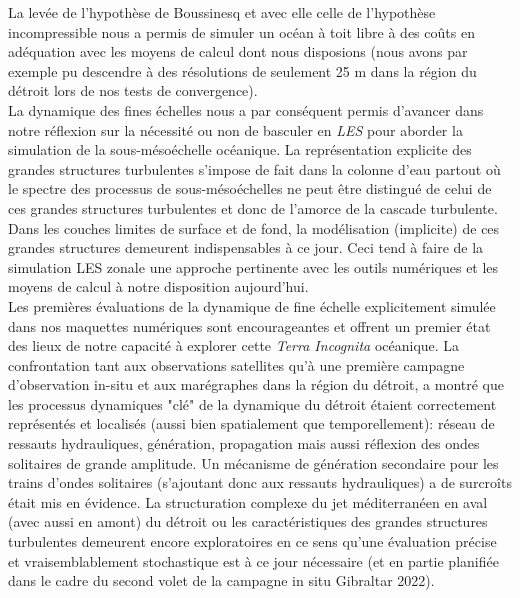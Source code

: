 La levée de l'hypothèse de Boussinesq et avec elle celle de l'hypothèse incompressible nous a permis de simuler un océan à toit libre à des coûts en adéquation avec les moyens de calcul dont nous disposions (nous avons par exemple pu descendre à des résolutions de seulement 25 m dans la région du détroit lors de nos tests de convergence).\\
La dynamique des fines échelles nous a par conséquent permis d'avancer dans notre réflexion sur la nécessité ou non de basculer en \textit{LES} pour aborder la simulation de la sous-mésoéchelle océanique. La représentation explicite des grandes structures turbulentes s'impose de fait dans la colonne d'eau partout où le spectre des processus de sous-mésoéchelles ne peut être distingué de celui de ces grandes structures turbulentes et donc de l'amorce de la cascade turbulente. Dans les couches limites de surface et de fond, la modélisation (implicite) de ces grandes structures demeurent indispensables à ce jour. Ceci tend à faire de la simulation LES zonale une approche pertinente avec les outils numériques et les moyens de calcul à notre disposition aujourd'hui.\\
Les premières évaluations de la dynamique de fine échelle explicitement simulée dans nos maquettes numériques sont encourageantes et offrent un premier état des lieux de notre capacité à explorer cette \textit{Terra Incognita} océanique. La confrontation tant aux observations satellites qu'à une première campagne d'observation in-situ et aux marégraphes dans la région du détroit, a montré que les processus dynamiques "clé" de la dynamique du détroit étaient correctement représentés et localisés (aussi bien spatialement que temporellement): réseau de ressauts hydrauliques, génération, propagation mais aussi réflexion des ondes solitaires de grande amplitude. Un mécanisme de génération secondaire pour les trains d'ondes solitaires (s'ajoutant donc aux ressauts hydrauliques) a de surcroîts était mis en évidence. La structuration complexe du jet méditerranéen en aval (avec aussi en amont) du détroit ou les caractéristiques des grandes structures turbulentes demeurent encore exploratoires en ce sens qu'une évaluation précise et vraisemblablement stochastique est à ce jour nécessaire (et en partie planifiée dans le cadre du second volet de la campagne in situ Gibraltar 2022).\\

